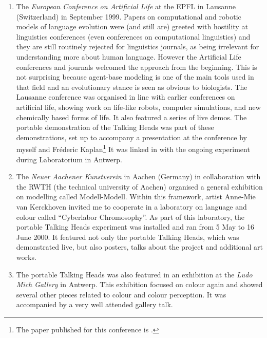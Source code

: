 \begin{enumerate}
\item The {\itshape European Conference on Artificial Life} at the EPFL in Lausanne (Switzerland) in September 1999. 
Papers on computational and robotic 
models of language evolution were (and still are) greeted with hostility at linguistics conferences (even 
conferences on computational linguistics) and they are still routinely rejected for linguistics journals, as 
being irrelevant for understanding more about human language. 
However the Artificial Life conferences and journals welcomed the approach from the beginning. This is 
not surprising because agent-base modeling is one of the main tools used in that field and an evolutionary 
stance is seen as obvious to biologists. The Lausanne conference was organised in line with earlier 
conferences on artificial life, showing work on life-like robots, computer simulations, and new chemically based 
forms of life. It also featured a series of live demos. The portable demonstration of the Talking Heads was part 
of these demonstrations, set up to accompany a presentation at 
the conference by myself and Fr\'{e}deric Kaplan\footnote{
The paper published for this conference is \cite{Steels:1999}.}
It was linked in with the ongoing experiment during Laboratorium in Antwerp. 
\item The {\itshape Neuer Aachener Kunstverein} in Aachen (Germany) in collaboration with the 
RWTH (the technical university of Aachen) organised a general exhibition on modelling called 
Modell-Modell. Within this framework, artist Anne-Mie van Kerckhoven invited me to cooperate in a laboratory on 
language and colour called ``Cyberlabor Chromosophy''. As part of this laboratory, the portable Talking Heads 
experiment was installed and ran from 5 May to 16 June 2000. It featured not only the portable Talking Heads, 
which was demonstrated live, but also posters, talks about the project and additional art works. 
\item The portable Talking Heads was also featured in an exhibition at the {\itshape Ludo Mich Gallery} in Antwerp. This 
exhibition focused on colour again and showed several other pieces related to colour and colour perception. 
It was accompanied by a very well attended gallery talk. 
\end{enumerate}
